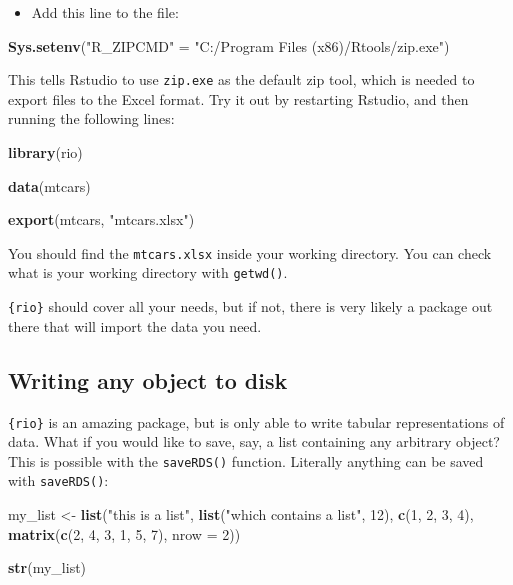\documentclass[]{gitbook}
\newenvironment{Shaded}{\begin{snugshade}}{\end{snugshade}}
\newcommand{\DataTypeTok}[1]{\textcolor[rgb]{0.13,0.29,0.53}{#1}}
\newcommand{\DecValTok}[1]{\textcolor[rgb]{0.00,0.00,0.81}{#1}}
\newcommand{\KeywordTok}[1]{\textcolor[rgb]{0.13,0.29,0.53}{\textbf{#1}}}
\newcommand{\NormalTok}[1]{#1}
\newcommand{\StringTok}[1]{\textcolor[rgb]{0.31,0.60,0.02}{#1}}
\providecommand{\tightlist}{%
  \setlength{\itemsep}{0pt}\setlength{\parskip}{0pt}}
\theoremstyle{definition}
\theoremstyle{definition}
\theoremstyle{definition}
\theoremstyle{remark}
\begin{document}
\begin{itemize}
\tightlist
\item
  Add this line to the file:
\end{itemize}

\begin{Shaded}
\begin{Highlighting}[]
\KeywordTok{Sys.setenv}\NormalTok{(}\StringTok{"R_ZIPCMD"}\NormalTok{ =}\StringTok{ "C:/Program Files (x86)/Rtools/zip.exe"}\NormalTok{)}
\end{Highlighting}
\end{Shaded}

This tells Rstudio to use \texttt{zip.exe} as the default zip tool,
which is needed to export files to the Excel format. Try it out by
restarting Rstudio, and then running the following lines:

\begin{Shaded}
\begin{Highlighting}[]
\KeywordTok{library}\NormalTok{(rio)}

\KeywordTok{data}\NormalTok{(mtcars)}

\KeywordTok{export}\NormalTok{(mtcars, }\StringTok{"mtcars.xlsx"}\NormalTok{)}
\end{Highlighting}
\end{Shaded}

You should find the \texttt{mtcars.xlsx} inside your working directory.
You can check what is your working directory with \texttt{getwd()}.

\texttt{\{rio\}} should cover all your needs, but if not, there is very
likely a package out there that will import the data you need.

\hypertarget{writing-any-object-to-disk}{%
\subsection{Writing any object to
disk}\label{writing-any-object-to-disk}}

\texttt{\{rio\}} is an amazing package, but is only able to write
tabular representations of data. What if you would like to save, say, a
list containing any arbitrary object? This is possible with the
\texttt{saveRDS()} function. Literally anything can be saved with
\texttt{saveRDS()}:

\begin{Shaded}
\begin{Highlighting}[]
\NormalTok{my_list <-}\StringTok{ }\KeywordTok{list}\NormalTok{(}\StringTok{"this is a list"}\NormalTok{, }\KeywordTok{list}\NormalTok{(}\StringTok{"which contains a list"}\NormalTok{, }\DecValTok{12}\NormalTok{), }\KeywordTok{c}\NormalTok{(}\DecValTok{1}\NormalTok{, }\DecValTok{2}\NormalTok{, }\DecValTok{3}\NormalTok{, }\DecValTok{4}\NormalTok{), }\KeywordTok{matrix}\NormalTok{(}\KeywordTok{c}\NormalTok{(}\DecValTok{2}\NormalTok{, }\DecValTok{4}\NormalTok{,}
\DecValTok{3}\NormalTok{, }\DecValTok{1}\NormalTok{, }\DecValTok{5}\NormalTok{, }\DecValTok{7}\NormalTok{), }\DataTypeTok{nrow =} \DecValTok{2}\NormalTok{))}

\KeywordTok{str}\NormalTok{(my_list)}
\end{Highlighting}
\end{Shaded}
\end{document}
